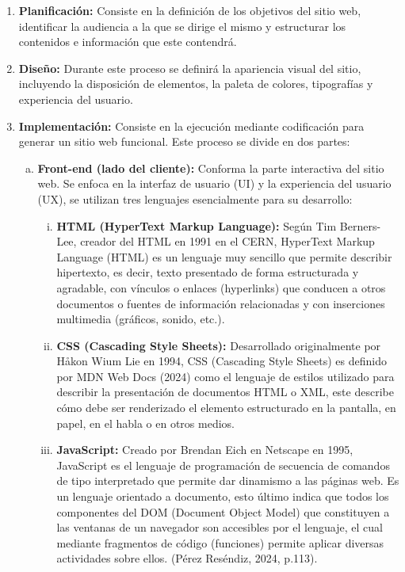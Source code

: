 \documentclass[12pt,a4paper]{report}
\begin{document}
\begin{enumerate}
\item \textbf{Planificación:} Consiste en la definición de los objetivos del sitio web, identificar la audiencia a la que se dirige el mismo y estructurar los contenidos e información que este contendrá.

\item \textbf{Diseño:} Durante este proceso se definirá la apariencia visual del sitio, incluyendo la disposición de elementos, la paleta de colores, tipografías y experiencia del usuario.

\item \textbf{Implementación:} Consiste en la ejecución mediante codificación para generar un sitio web funcional. Este proceso se divide en dos partes:
\begin{enumerate}[a.]
\item \textbf{Front-end (lado del cliente):} Conforma la parte interactiva del sitio web. Se enfoca en la interfaz de usuario (UI) y la experiencia del usuario (UX), se utilizan tres lenguajes esencialmente para su desarrollo:
\begin{enumerate}[i.]
\item \textbf{HTML (HyperText Markup Language):} Según Tim Berners-Lee, creador del HTML en 1991 en el CERN, HyperText Markup Language (HTML) es un lenguaje muy sencillo que permite describir hipertexto, es decir, texto presentado de forma estructurada y agradable, con vínculos o enlaces (hyperlinks) que conducen a otros documentos o fuentes de información relacionadas y con inserciones multimedia (gráficos, sonido, etc.).

\item \textbf{CSS (Cascading Style Sheets):} Desarrollado originalmente por Håkon Wium Lie en 1994, CSS (Cascading Style Sheets) es definido por MDN Web Docs (2024) como el lenguaje de estilos utilizado para describir la presentación de documentos HTML o XML, este describe cómo debe ser renderizado el elemento estructurado en la pantalla, en papel, en el habla o en otros medios.

\item \textbf{JavaScript:} Creado por Brendan Eich en Netscape en 1995, JavaScript es el lenguaje de programación de secuencia de comandos de tipo interpretado que permite dar dinamismo a las páginas web. Es un lenguaje orientado a documento, esto último indica que todos los componentes del DOM (Document Object Model) que constituyen a las ventanas de un navegador son accesibles por el lenguaje, el cual mediante fragmentos de código (funciones) permite aplicar diversas actividades sobre ellos. (Pérez Reséndiz, 2024, p.113).
\end{enumerate}


\end{enumerate}
\end{enumerate}
\end{document}
